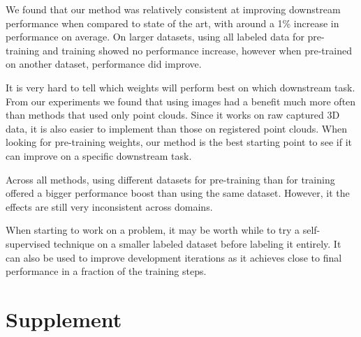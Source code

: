 \documentclass[10pt,twocolumn,letterpaper]{article}
\begin{document}
We found that our method was relatively consistent at improving downstream performance when compared to state of the art, with around a 1\% increase in performance on average. On larger datasets, using all labeled data for pre-training and training showed no performance increase, however when pre-trained on another dataset, performance did improve.

It is very hard to tell which weights will perform best on which downstream task. From our experiments we found that using images had a benefit much more often than methods that used only point clouds. Since it works on raw captured 3D data, it is also easier to implement than those on registered point clouds. When looking for pre-training weights, our method is the best starting point to see if it can improve on a specific downstream task.

Across all methods, using different datasets for pre-training than for training offered a bigger performance boost than using the same dataset. However, it the effects are still very inconsistent across domains.

When starting to work on a problem, it may be worth while to try a self-supervised technique on a smaller labeled dataset before labeling it entirely. It can also be used to improve development iterations as it achieves close to final performance in a fraction of the training steps.




\clearpage
{\small
    
    
}

\clearpage
\section{Supplement}
\end{document}
